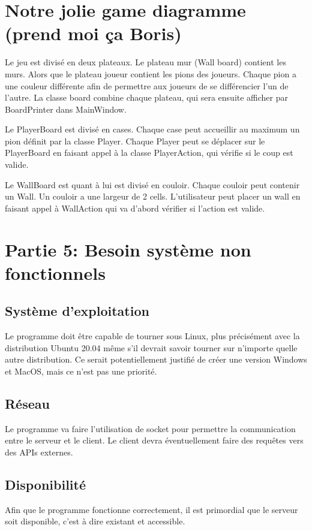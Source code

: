 \section{Notre jolie game diagramme (prend moi ça Boris)}

Le jeu est divisé en deux plateaux. Le plateau mur (Wall board) contient les murs. Alors que le plateau joueur contient les pions des
joueurs. Chaque pion a une couleur différente afin de permettre aux joueurs de se différencier l'un de l'autre. La classe board combine
chaque plateau, qui sera ensuite afficher par BoardPrinter dans MainWindow. 

Le PlayerBoard est divisé en cases. Chaque case peut accueillir au maximum un pion définit par la classe Player. Chaque Player peut
se déplacer sur le PlayerBoard en faisant appel à la classe PlayerAction, qui vérifie si le coup est valide.

Le WallBoard est quant à lui est divisé en couloir. Chaque couloir peut contenir un Wall. Un couloir a une largeur de 2 cells. L'utilisateur
peut placer un wall en faisant appel à WallAction qui va d'abord vérifier si l'action est valide.

\section{Partie 5: Besoin système non fonctionnels}
\subsection{Système d'exploitation}
Le programme doit être capable de tourner sous Linux, plus précisément avec la distribution Ubuntu 20.04 même s'il devrait savoir tourner
sur n'importe quelle autre distribution.
Ce serait potentiellement justifié de créer une version Windows et MacOS, mais ce n'est pas une priorité.

\subsection{Réseau}
Le programme va faire l'utilisation de socket pour permettre la communication entre le serveur et le client. 
Le client devra éventuellement faire des requêtes vers des APIs externes.

\subsection{Disponibilité}
Afin que le programme fonctionne correctement, il est primordial que le serveur soit disponible, c'est à dire existant et accessible. 

